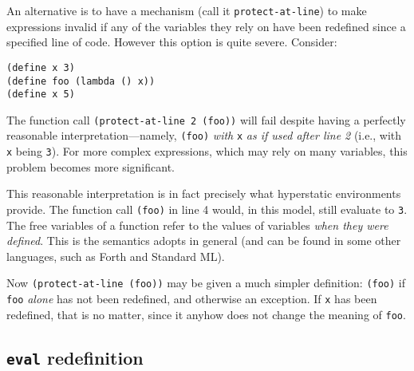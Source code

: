 An alternative is to have a mechanism (call it \texttt{protect-at-line}) to
make expressions invalid if any of the variables they rely on have been
redefined since a specified line of code.
However this option is quite severe. Consider:
\begin{lstlisting}
(define x 3)
(define foo (lambda () x))
(define x 5)
\end{lstlisting}
The function call \texttt{(protect-at-line 2 (foo))} will fail despite having a
perfectly reasonable interpretation---namely, \texttt{(foo)} \emph{with}
\texttt{x} \emph{as if used after line 2} (i.e., with \texttt{x} being
\texttt{3}). For more complex expressions, which may rely on many variables,
this problem becomes more significant.

This reasonable interpretation is in fact precisely what hyperstatic
environments provide. The function call \texttt{(foo)} in line 4 would, in this
model, still evaluate to \texttt{3}. The free variables of a function refer to
the values of variables \emph{when they were defined}. This is the semantics
\rad{} adopts in general (and can be found in some other languages, such as
Forth and Standard ML\cite{SML1997}).

Now \texttt{(protect-at-line (foo))} may be given a much simpler definition:
\texttt{(foo)} if \texttt{foo} \emph{alone} has not been redefined, and otherwise
an exception. If \texttt{x} has been redefined, that is no matter, since it
anyhow does not change the meaning of \texttt{foo}.


\subsection{\texttt{eval} redefinition}

